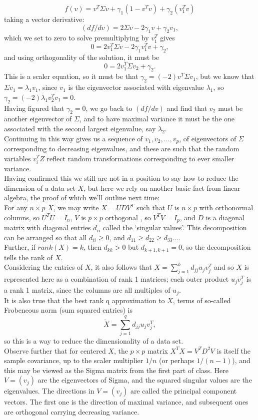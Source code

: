 \documentclass[11pt,a4paper]{article}
\begin{document}
$$f(v) = v^T \Sigma v + \gamma_1 ( 1-v^T v ) + \gamma_2 (v_1^T v)$$
taking a vector derivative:
$$(df/dv) = 2 \Sigma v - 2 \gamma_1 v + \gamma_2 v_1,$$    which we set to zero to solve premultiplying by $v_1^T$ gives
$$0 = 2 v_1^T \Sigma v - 2 \gamma_1 v_1^T v + \gamma_2,$$
and using orthogonality of the solution, it must be
$$0 = 2 v_1^T \Sigma v_2 + \gamma_2.$$
This is a scaler equation, so it must be that $\gamma_2 = (-2) v^T \Sigma v_1$, but we know that $\Sigma v_1 = \lambda_1 v_1$, since $v_1$ is the eigenvector associated with eigenvalue $\lambda_1$, so $\gamma_2 = (-2) \lambda_1 v_2^T v_1 = 0$.\\
Having figured that $\gamma_2=0$, we go back to $(df/dv)$ and find that $v_2$ must be another eigenvector of $\Sigma$, and to have maximal variance it must be the one associated with the second largest eigenvalue, say $\lambda_2$.\\
Continuing in this way gives us a sequence of $v_1, v_2,\ldots, v_p$, of eigenvectors of $\Sigma$ corresponding to decreasing eigenvalues, and these are such that the random variables $v_i^T Z$ reflect random transformations corresponding to ever smaller variance.\\
Having confirmed this we still are not in a position to say how to reduce the dimension of a data set $X$, but here we rely on another basic fact from linear algebra, the proof of which we'll outline next time:\\
For any $n\times p$ $X$, we may write  $X = U D V^T$ such that $U$ is $n \times p$ with orthonormal columns, so $U^T U = I_n$, $V$ is $p \times p$ orthogonal , so $V^T V = I_p$, and $D$ is a diagonal matrix with diagonal entries $d_{ii}$ called the `singular values'. This decomposition can be arranged so that all $d_{ii} \geq 0$, and $d_11 \geq d_22 \geq d_33...$.\\
Further, if $rank(X) = k$, then $d_{kk} > 0$ but $d_{k+1,k+1} = 0$, so the decomposition tells the rank of $X$.\\
Considering the entries of $X$, it also follows that $X = \sum_{j=1}^k d_{jj} u_j v_j^T$ 
and so $X$ is represented here as a combination of rank 1 matrices; each outer product $u_j v_j^T$ is a rank 1 matrix, since the columns are all multiples of $u_j$.\\
It is also true that the best rank q approximation to $X$, terms of so-called Frobeneous norm (sum squared entries) is
$$\tilde{X}= \sum_{j=1}^q d_{jj} u_j v_j^T,$$
so this is a way to reduce the dimensionality of a data set.\\
Observe further that for centered $X$, the $p\times p$ matrix $X^T X = V^T D^2 V$ is itself the sample covariance, up to the scaler multiplier $1/n$ (or perhaps $1/(n-1)$), and this may be viewed as the Sigma matrix from the first part of class.  Here $V = (v_j)$ are the eigenvectors of Sigma, and the squared singular values are the eigenvalues. The
directions in $V=(v_j)$ are called the principal component vectors.  The first one is the direction of maximal variance, and subsequent ones are orthogonal carrying decreasing variance.
\end{document}
